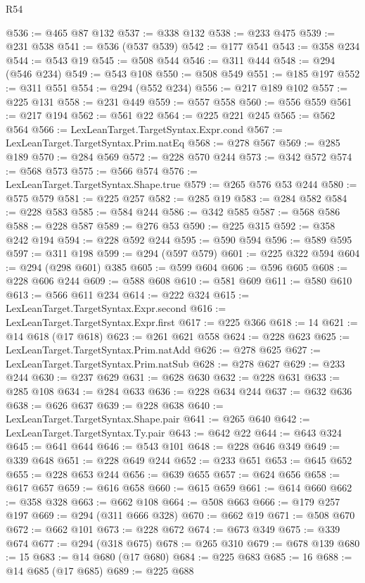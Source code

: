 \begin{lexlean}{R54}
\begin{coremodule}
@536 := @465 @87 @132
@537 := @338 @132
@538 := @233 @475
@539 := @231 @538
@541 := @536 (@537 @539)
@542 := @177 @541
@543 := @358 @234
@544 := @543 @19
@545 := @508 @544
@546 := @311 @444
@548 := @294 (@546 @234)
@549 := @543 @108
@550 := @508 @549
@551 := @185 @197
@552 := @311 @551
@554 := @294 (@552 @234)
@556 := @217 @189 @102
@557 := @225 @131
@558 := @231 @449
@559 := @557 @558
@560 := @556 @559
@561 := @217 @194
@562 := @561 @22
@564 := @225 @221 @245
@565 := @562 @564
@566 := LexLeanTarget.TargetSyntax.Expr.cond
@567 := LexLeanTarget.TargetSyntax.Prim.natEq
@568 := @278 @567
@569 := @285 @189
@570 := @284 @569
@572 := @228 @570 @244
@573 := @342 @572
@574 := @568 @573
@575 := @566 @574
@576 := LexLeanTarget.TargetSyntax.Shape.true
@579 := @265 @576 @53 @244
@580 := @575 @579
@581 := @225 @257
@582 := @285 @19
@583 := @284 @582
@584 := @228 @583
@585 := @584 @244
@586 := @342 @585
@587 := @568 @586
@588 := @228 @587
@589 := @276 @53
@590 := @225 @315
@592 := @358 @242 @194
@594 := @228 @592 @244
@595 := @590 @594
@596 := @589 @595
@597 := @311 @198
@599 := @294 (@597 @579)
@601 := @225 @322 @594
@604 := @294 (@298 @601) @385
@605 := @599 @604
@606 := @596 @605
@608 := @228 @606 @244
@609 := @588 @608
@610 := @581 @609
@611 := @580 @610
@613 := @566 @611 @234
@614 := @222 @324
@615 := LexLeanTarget.TargetSyntax.Expr.second
@616 := LexLeanTarget.TargetSyntax.Expr.first
@617 := @225 @366
@618 := 14
@621 := @14 @618 (@17 @618)
@623 := @261 @621 @558
@624 := @228 @623
@625 := LexLeanTarget.TargetSyntax.Prim.natAdd
@626 := @278 @625
@627 := LexLeanTarget.TargetSyntax.Prim.natSub
@628 := @278 @627
@629 := @233 @244
@630 := @237 @629
@631 := @628 @630
@632 := @228 @631
@633 := @285 @108
@634 := @284 @633
@636 := @228 @634 @244
@637 := @632 @636
@638 := @626 @637
@639 := @228 @638
@640 := LexLeanTarget.TargetSyntax.Shape.pair
@641 := @265 @640
@642 := LexLeanTarget.TargetSyntax.Ty.pair
@643 := @642 @22
@644 := @643 @324
@645 := @641 @644
@646 := @543 @101
@648 := @228 @646 @349
@649 := @339 @648
@651 := @228 @649 @244
@652 := @233 @651
@653 := @645 @652
@655 := @228 @653 @244
@656 := @639 @655
@657 := @624 @656
@658 := @617 @657
@659 := @616 @658
@660 := @615 @659
@661 := @614 @660
@662 := @358 @328
@663 := @662 @108
@664 := @508 @663
@666 := @179 @257 @197
@669 := @294 (@311 @666 @328)
@670 := @662 @19
@671 := @508 @670
@672 := @662 @101
@673 := @228 @672
@674 := @673 @349
@675 := @339 @674
@677 := @294 (@318 @675)
@678 := @265 @310
@679 := @678 @139
@680 := 15
@683 := @14 @680 (@17 @680)
@684 := @225 @683
@685 := 16
@688 := @14 @685 (@17 @685)
@689 := @225 @688

\end{coremodule}
\end{lexlean}
